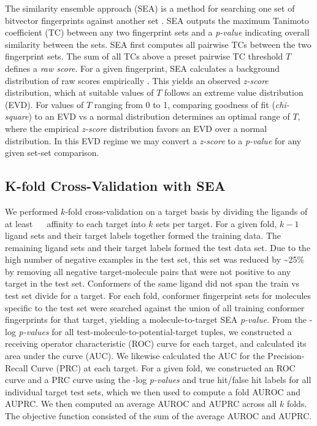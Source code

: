 \documentclass[../main.tex]{subfiles}
\begin{document}
\begin{refsection}
The similarity ensemble approach (SEA) is a method for searching one set of bitvector fingerprints against another set \cite{keiser_2007}.
SEA outputs the maximum Tanimoto coefficient (TC) between any two fingerprint sets and a \emph{p-value} indicating overall similarity between the sets.
SEA first computes all pairwise TCs between the two fingerprint sets.
The sum of all TCs above a preset pairwise TC threshold $T$ defines a \emph{raw score}.
For a given fingerprint, SEA calculates a background distribution of raw scores empirically  \cite{keiser_2007}.
This yields an observed \emph{z-score} distribution, which at suitable values of $T$ follows an extreme value distribution (EVD).
For values of $T$ ranging from 0 to 1, comparing goodness of fit (\emph{chi-square}) to an EVD vs a normal distribution determines an optimal range of $T$, where the empirical \emph{z-score} distribution favors an EVD over a normal distribution.
In this EVD regime we may convert a \emph{z-score} to a  \emph{p-value} for any given set-set comparison.

\subsection*{K-fold Cross-Validation with SEA}

We performed $k$-fold cross-validation on a target basis by dividing the ligands of at least \SI{}{\micro\molar} affinity to each target into  $k$ sets per target.
For a given fold, $k-1$ ligand sets and their target labels together formed the training data.
The remaining ligand sets and their target labels formed the test data set.
Due to the high number of negative examples in the test set, this set was reduced by \textasciitilde{}25\% by removing all negative target-molecule pairs that were not positive to any target in the test set.
Conformers of the same ligand did not span the train vs test set divide for a target.
For each fold, conformer fingerprint sets for molecules specific to the test set were searched against the union of all training conformer fingerprints for that target, yielding a molecule-to-target SEA  \emph{p-value}.
From the -log \emph{p-values} for all test-molecule-to-potential-target tuples, we constructed a receiving operator characteristic (ROC) curve for each target, and calculated its area under the curve (AUC).
We likewise calculated the AUC for the Precision-Recall Curve (PRC) at each target.
For a given fold, we constructed an ROC curve and a PRC curve using the -log \emph{p-values}
and true hit/false hit labels for all individual target test sets, which we then used to compute a fold AUROC and AUPRC.
We then computed an average AUROC and AUPRC across all $k$ folds.
The objective function \AUCsum{} consisted of the sum of the average AUROC and AUPRC.


\end{refsection}
\end{document}

